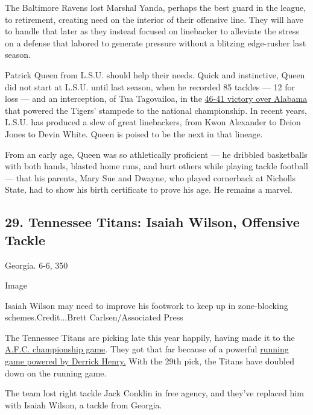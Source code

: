 The Baltimore Ravens lost Marshal Yanda, perhaps the best guard in the
league, to retirement, creating need on the interior of their offensive
line. They will have to handle that later as they instead focused on
linebacker to alleviate the stress on a defense that labored to generate
pressure without a blitzing edge-rusher last season.

Patrick Queen from L.S.U. should help their needs. Quick and
instinctive, Queen did not start at L.S.U. until last season, when he
recorded 85 tackles --- 12 for loss --- and an interception, of Tua
Tagovailoa, in the
\href{https://www.nytimes3xbfgragh.onion/2019/11/09/sports/ncaafootball/lsu-alabama-tigers-tide.html}{46-41
victory over Alabama} that powered the Tigers' stampede to the national
championship. In recent years, L.S.U. has produced a slew of great
linebackers, from Kwon Alexander to Deion Jones to Devin White. Queen is
poised to be the next in that lineage.

From an early age, Queen was so athletically proficient --- he dribbled
basketballs with both hands, blasted home runs, and hurt others while
playing tackle football --- that his parents, Mary Sue and Dwayne, who
played cornerback at Nicholls State, had to show his birth certificate
to prove his age. He remains a marvel.

\hypertarget{29-tennessee-titans-isaiah-wilson-offensive-tackle}{%
\subsection{29. Tennessee Titans: Isaiah Wilson, Offensive
Tackle}\label{29-tennessee-titans-isaiah-wilson-offensive-tackle}}

Georgia. 6-6, 350

Image

Isaiah Wilson may need to improve his footwork to keep up in
zone-blocking schemes.Credit...Brett Carlsen/Associated Press

The Tennessee Titans are picking late this year happily, having made it
to the
\href{https://www.nytimes3xbfgragh.onion/live/2020/titans-chiefs-01-19}{A.F.C.
championship game}. They got that far because of a powerful
\href{https://www.nytimes3xbfgragh.onion/2020/01/16/sports/derrick-henry-titans-playoffs.html}{running
game powered by Derrick Henry.} With the 29th pick, the Titans have
doubled down on the running game.

The team lost right tackle Jack Conklin in free agency, and they've
replaced him with Isaiah Wilson, a tackle from Georgia.

